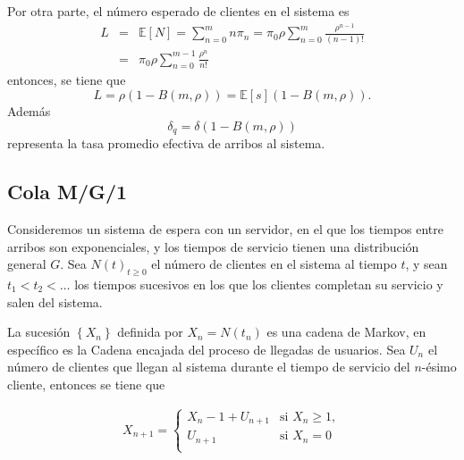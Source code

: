\documentclass{article}
\newcommand{\esp}{\mathbb{E}}
\begin{document}
Por otra parte, el n\'umero esperado de clientes en el sistema es
\begin{eqnarray*}
L&=&\esp\left[N\right]=\sum_{n=0}^{m}n\pi_{n}=\pi_{0}\rho\sum_{n=0}^{m}\frac{\rho^{n-1}}{\left(n-1\right)!}\\
&=&\pi_{0}\rho\sum_{n=0}^{m-1}\frac{\rho^{n}}{n!}
\end{eqnarray*}
entonces, se tiene que
\begin{equation}
L=\rho\left(1-B\left(m,\rho\right)\right)=\esp\left[s\right]\left(1-B\left(m,\rho\right)\right).
\end{equation}
Adem\'as
\begin{equation}
\delta_{q}=\delta\left(1-B\left(m,\rho\right)\right)
\end{equation}
representa la tasa promedio efectiva de arribos al sistema.
%
\subsection{Cola M/G/1}
%
Consideremos un sistema de espera con un servidor, en el que los tiempos entre arribos son exponenciales, y los tiempos de servicio tienen una distribuci\'on general $G$. Sea $N\left(t\right)_{t\geq0}$ el n\'umero de clientes en el sistema al tiempo $t$, y sean $t_{1}<t_{2}<\dots$ los tiempos sucesivos en los que los clientes completan su servicio y salen del sistema.

La sucesi\'on $\left\{X_{n}\right\}$ definida por
$X_{n}=N\left(t_{n}\right)$ es una cadena de Markov, en espec\'ifico es la Cadena encajada del proceso de llegadas de usuarios. Sea $U_{n}$ el n\'umero de clientes que llegan al sistema durante el tiempo de servicio del $n$-\'esimo cliente, entonces se tiene que

\begin{eqnarray*}
X_{n+1}=\left\{\begin{array}{cc}
X_{n}-1+U_{n+1} & \textrm{si }X_{n}\geq1,\\
U_{n+1} & \textrm{si }X_{n}=0\\
\end{array}\right.
\end{eqnarray*}
\end{document}
